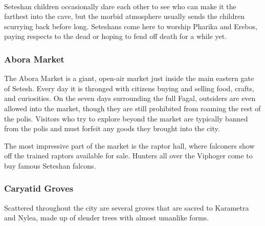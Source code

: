         \pagebreak~
        \vspace{12.5cm}

        Seteshan children occasionally dare each other to see who can make it the farthest into the cave, but the morbid atmosphere usually sends the children scurrying back before long.
        Seteshans come here to worship Pharika and Erebos, paying respects to the dead or hoping to fend off death for a while yet.

    \subsubsection{Abora Market}
        The Abora Market is a giant, open-air market just inside the main eastern gate of Setesh.
        Every day it is thronged with citizens buying and selling food, crafts, and curiosities.
        On the seven days surrounding the full Fagal, outsiders are even allowed into the market, though they are still prohibited from roaming the rest of the polis.
        Visitors who try to explore beyond the market are typically banned from the polis and must forfeit any goods they brought into the city.

        The most impressive part of the market is the raptor hall, where falconers show off the trained raptors available for sale.
        Hunters all over the Viphoger come to buy famous Seteshan falcons.

    \subsubsection{Caryatid Groves}
        Scattered throughout the city are several groves that are sacred to Karametra and Nylea, made up of slender trees with almost umanlike forms.


